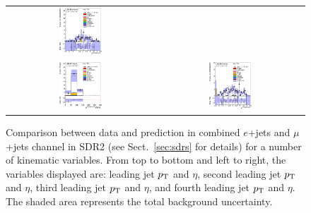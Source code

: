 \begin{figure}[htbp]
\begin{center}
\begin{tabular}{cc}
\includegraphics[width=0.30\textwidth]{appendices/figures/sdrs/JetEta3_ELEMUONCR1_1W_NOMINAL.eps} \\
\includegraphics[width=0.30\textwidth]{appendices/figures/sdrs/JetPt4_ELEMUONCR1_1W_NOMINAL.eps}  &
\includegraphics[width=0.30\textwidth]{appendices/figures/sdrs/JetEta4_ELEMUONCR1_1W_NOMINAL.eps}  \\
\end{tabular}\caption{\small {Comparison between data and prediction in combined $e$+jets and $\mu$+jets channel in SDR2 (see Sect.~\ref{sec:sdrs} for details) 
for a number of kinematic variables. From top to bottom and left to right, the variables displayed are: leading jet $\pt$ and $\eta$,  second leading jet $\pt$ and $\eta$,
third leading jet $\pt$ and $\eta$, and fourth leading jet $\pt$ and $\eta$. The shaded area represents the total background uncertainty.}}
\label{fig:ELEMUONCR1_2}
\end{center}
\end{figure}                                                                             

